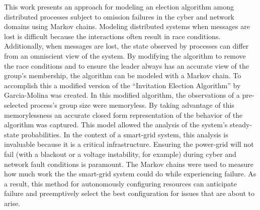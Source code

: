 This work presents an approach for modeling an election algorithm among distributed processes subject to omission failures in the cyber and network domains using Markov chains.
Modeling distributed systems when messages are lost is difficult because the interactions often result in race conditions.
Additionally, when messages are lost, the state observed by processes can differ from an omniscient view of the system.
By modifying the algorithm to remove the race conditions and to ensure the leader always has an accurate view of the group's membership, the algorithm can be modeled with a Markov chain.
To accomplish this a modified version of the ``Invitation Election Algorithm'' by Garcia-Molina was created.
In this modified algorithm, the observations of a pre-selected process's group size were memoryless.
By taking advantage of this memorylessness an accurate closed form representation of the behavior of the algorithm was captured.
This model allowed the analysis of the system's steady-state probabilities.
In the context of a smart-grid system, this analysis is invaluable because it is a critical infrastructure.
Ensuring the power-grid will not fail (with a blackout or a voltage instability, for example) during cyber and network fault conditions is paramount.
The Markov chains were used to measure how much work the the smart-grid system could do while experiencing failure.
As a result, this method for autonomously configuring resources can anticipate failure and preemptively select the best configuration for issues that are about to arise.
